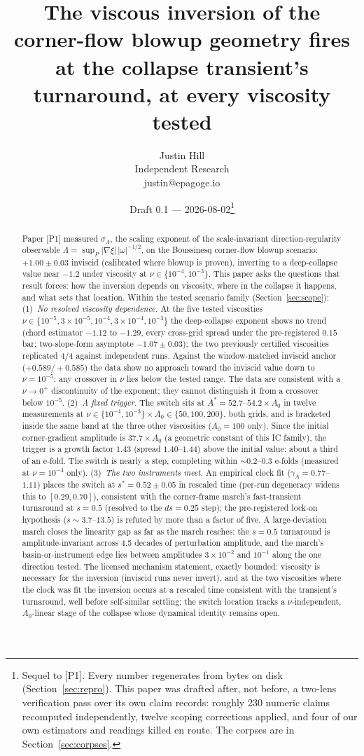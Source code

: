 \documentclass[11pt]{article}
\title{The viscous inversion of the corner-flow blowup geometry fires at
the collapse transient's turnaround, at every viscosity tested}
\author{Justin Hill\\ \small Independent Research \\ \small justin@epagoge.io}
\date{Draft 0.1 --- 2026-08-02\thanks{Sequel to [P1]. Every number
regenerates from bytes on disk (Section~\ref{sec:repro}). This paper was
drafted after, not before, a two-lens verification pass over its own
claim records: roughly 230 numeric claims recomputed independently,
twelve scoping corrections applied, and four of our own estimators and
readings killed en route. The corpses are in Section~\ref{sec:corpses}.}}
\newcommand{\om}{\omega}
\newcommand{\Lam}{\Lambda}
\newcommand{\sL}{\sigma_{\!\Lambda}}
\newcommand{\Anaught}{A_0}
\begin{document}
\maketitle

\begin{abstract}
Paper [P1] measured $\sL$, the scaling exponent of the scale-invariant
direction-regularity observable $\Lam=\sup_P|\nabla\xi|\,|\om|^{-1/2}$,
on the Boussinesq corner-flow blowup scenario: $+1.00\pm0.03$ inviscid
(calibrated where blowup is proven), inverting to a deep-collapse value
near $-1.2$ under viscosity at $\nu\in\{10^{-4},10^{-3}\}$. This paper
asks the questions that result forces: how the inversion depends on
viscosity, where in the collapse it happens, and what sets that
location. Within the tested scenario family (Section~\ref{sec:scope}):
(1)~\emph{No resolved viscosity dependence.} At the five tested
viscosities $\nu\in\{10^{-5},3\times10^{-5},10^{-4},3\times10^{-4},
10^{-3}\}$ the deep-collapse exponent shows no trend (chord estimator
$-1.12$ to $-1.29$, every cross-grid spread under the pre-registered
$0.15$ bar; two-slope-form asymptote $-1.07\pm0.03$); the two
previously certified viscosities replicated 4/4 against independent
runs. Against the window-matched inviscid anchor ($+0.589/+0.585$) the
data show no approach toward the inviscid value down to $\nu=10^{-5}$:
any crossover in $\nu$ lies below the tested range. The data are
consistent with a $\nu\to0^{+}$ discontinuity of the exponent; they
cannot distinguish it from a crossover below $10^{-5}$.
(2)~\emph{A fixed trigger.} The switch sits at
$A^{*}=52.7$--$54.2\times\Anaught$ in twelve measurements at
$\nu\in\{10^{-4},10^{-3}\}\times\Anaught\in\{50,100,200\}$, both grids,
and is bracketed inside the same band at the three other viscosities
($\Anaught=100$ only). Since the initial corner-gradient amplitude is
$37.7\times\Anaught$ (a geometric constant of this IC family), the
trigger is a growth factor $1.43$ (spread $1.40$--$1.44$) above the
initial value: about a third of an e-fold. The switch is nearly a step,
completing within ${\sim}0.2$--$0.3$ e-folds (measured at $\nu=10^{-4}$
only). (3)~\emph{The two instruments meet.} An empirical clock fit
($\gamma_A=0.77$--$1.11$) places the switch at $s^{*}=0.52\pm0.05$ in
rescaled time (per-run degeneracy widens this to $[0.29,0.70]$),
consistent with the corner-frame march's fast-transient turnaround at
$s=0.5$ (resolved to the $ds=0.25$ step); the pre-registered lock-on
hypothesis ($s\sim3.7$--$13.5$) is refuted by more than a factor of
five. A large-deviation march closes the linearity gap as far as the
march reaches: the $s=0.5$ turnaround is amplitude-invariant across
4.5 decades of perturbation amplitude, and the march's
basin-or-instrument edge lies between amplitudes $3\times10^{-2}$ and
$10^{-1}$ along the one direction tested. The licensed mechanism
statement, exactly bounded: viscosity is necessary for the inversion
(inviscid runs never invert), and at the two viscosities where the
clock was fit the inversion occurs at a rescaled time consistent with
the transient's turnaround, well before self-similar settling; the
switch location tracks a $\nu$-independent, $\Anaught$-linear stage of
the collapse whose dynamical identity remains open.
\end{abstract}
\end{document}
